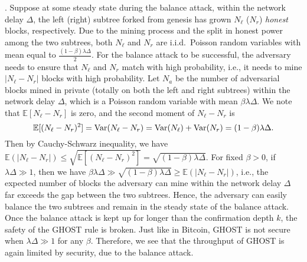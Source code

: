 \documentclass{article}
\newcommand{\pramod}[1]{{\color{red}
\footnotesize[Pramod: #1] }}
\newcommand{\xw}[1]{{\color{green}
\footnotesize[Xuechao: #1] }}
\begin{document}
.  Suppose at some steady state during the balance attack,  within the network delay $\Delta$, the left (right)  subtree forked from genesis has grown $N_\ell$ ($N_r$) {\em honest} blocks, respectively. Due to the mining process and the split in honest power among the two subtrees, both $N_\ell$ and $N_r$ are i.i.d.\ Poisson random variables with mean  equal to  $\frac{(1-\beta)\lambda \Delta}{2}$. For the balance attack to be successful, the adversary needs to ensure that $N_\ell$ and $N_r$ match with high probability, i.e., it needs to mine $|N_\ell-N_r|$ blocks with high probability. Let $N_a$ be the number of adversarial blocks mined in private (totally on both the left and right subtrees) within the network delay $\Delta$, which is a Poisson random variable with mean $\beta\lambda\Delta$. 
We note that $\mathbb{E}[N_\ell - N_r]$ is zero, and the second moment of $N_\ell - N_r$ is 
$$
  \mathbb{E}[(N_\ell - N_r)^2]  = {\rm Var}(N_\ell - N_r) = {\rm Var}(N_\ell) + {\rm Var}(N_r)= (1-\beta)\lambda \Delta. 
$$
Then by Cauchy-Schwarz inequality, we have $\mathbb{E}(|N_\ell -N_r|) \leq \sqrt{\mathbb{E}[(N_\ell - N_r)^2]} = \sqrt{(1-\beta)\lambda \Delta}$.
For fixed $\beta > 0$, if $\lambda\Delta \gg 1$, then we have $\beta \lambda\Delta \gg \sqrt{(1-\beta)\lambda \Delta} \geq \mathbb{E}(|N_\ell -N_r|)$, i.e., the expected number of blocks the adversary can mine within the network delay $\Delta$ far exceeds the gap between the two subtrees. Hence, the adversary can easily balance the two subtrees and remain in the steady state of the balance attack. Once the balance attack is kept up for longer than the confirmation depth $k$,  the safety of the {\sf GHOST} rule is broken. Just like in Bitcoin, {\sf GHOST} is not secure when $\lambda\Delta \gg 1$ for any $\beta$. Therefore, we see that the throughput of {\sf GHOST} is again limited by security, due to the balance attack.

 
\end{document}
